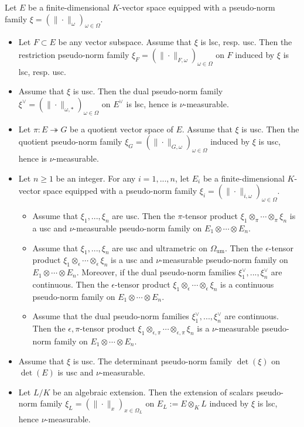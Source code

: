 \documentclass [11pt,reqno]{amsart}
\newcommand{\1}{\mathmybb{1}}
\def\um{\operatorname{um}}
\begin{document}
\begin{proposition} 
\label{prop:constructions_continuous_semi-norm_families}
Let $E$ be a finite-dimensional $K$-vector space equipped with a pseudo-norm family $\xi =(\|\cdot\|_\omega)_{\omega\in \Omega}$. 
\begin{itemize}
	\item[(1)] Let $F \subset E$ be any vector subspace. Assume that $\xi$ is lsc, resp. usc. Then the restriction pseudo-norm family $\xi_{F}=(\|\cdot\|_{F,\omega})_{\omega\in \Omega}$ on $F$ induced by $\xi$ is lsc, resp. usc.
	\item[(2)] Assume that $\xi$ is usc. Then the dual pseudo-norm family $\xi^{\vee}=(\|\cdot\|_{\omega,\ast})_{\omega\in \Omega}$ on $E^{\vee}$ is lsc, hence is $\nu$-measurable.
	\item[(3)] Let $\pi: E \twoheadrightarrow G$ be a quotient vector space of $E$. Assume that $\xi$ is usc. Then the quotient pseudo-norm family $\xi_{G}=(\|\cdot\|_{G,\omega})_{\omega\in \Omega}$ induced by $\xi$ is usc, hence is $\nu$-measurable.
	\item[(4)] Let $n\geq 1$ be an integer. For any $i=1,...,n$, let $E_i$ be a finite-dimensional $K$-vector space equipped with a pseudo-norm family $\xi_i =(\|\cdot\|_{i,\omega})_{\omega\in \Omega}$. 
	\begin{itemize}
		\item[(4.a)] Assume that $\xi_1,...,\xi_n$ are usc. Then the $\pi$-tensor product $\xi_1 \otimes_{\pi} \cdots \otimes_{\pi} \xi_n$ is a usc and $\nu$-measurable pseudo-norm family on $ E_1\otimes \cdots\otimes E_n$.
		\item[(4.b)] Assume that $\xi_1,...,\xi_n$ are usc and ultrametric on $\Omega_{\um}$. Then the $\epsilon$-tensor product $\xi_1 \otimes_{\epsilon} \cdots \otimes_{\epsilon} \xi_n$ is a usc and $\nu$-measurable pseudo-norm family on $E_1\otimes \cdots\otimes E_n$. Moreover, if the dual pseudo-norm families $\xi_1^{\vee},...,\xi_n^{\vee}$ are continuous. Then the $\epsilon$-tensor product $\xi_1 \otimes_{\epsilon} \cdots \otimes_{\epsilon} \xi_n$ is a continuous pseudo-norm family on $E_1\otimes \cdots\otimes E_n$.
		
	
		\item[(4.c)] Assume that the dual pseudo-norm families $\xi_1^{\vee},...,\xi_n^{\vee}$ are continuous. Then the $\epsilon,\pi$-tensor product $\xi_1 \otimes_{\epsilon,\pi} \cdots \otimes_{\epsilon,\pi} \xi_n$ is a $\nu$-measurable pseudo-norm family on $E_1\otimes \cdots\otimes E_n$.
	\end{itemize}
	\item[(5)] Assume that $\xi$ is usc. The determinant pseudo-norm family $\det(\xi)$ on $\det(E)$ is usc and $\nu$-measurable. 
	\item[(6)] Let $L/K$ be an algebraic extension. Then the extension of scalars pseudo-norm family $\xi_L=(\|\cdot\|_{x})_{x\in \Omega_L}$ on $E_L := E \otimes_{K} L$ induced by $\xi$ is lsc, hence $\nu$-measurable. 
\end{itemize}
\end{proposition}
\end{document}
